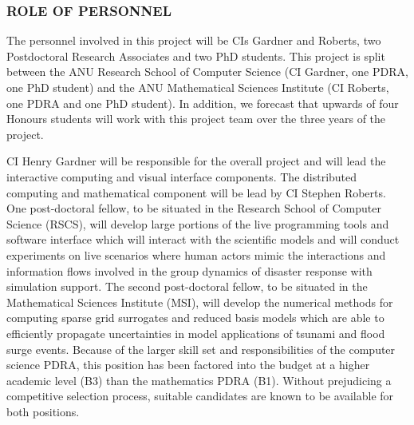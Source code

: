 \documentclass[a4paper,fontsize=13pt]{scrartcl}
\begin{document}
\subsubsection*{ROLE OF PERSONNEL}

%


The personnel involved in this project will be  CIs Gardner and Roberts, two Postdoctoral Research Associates and two PhD students. 
This project is split between the ANU Research School of Computer Science (CI Gardner, one PDRA, one PhD student) and the ANU Mathematical Sciences Institute (CI Roberts, one PDRA and one PhD student). In addition, we forecast that upwards of four Honours students will work with this project team over the three years of the project.

CI Henry Gardner will be responsible for the overall project and will lead the
interactive computing and visual interface components. The distributed computing
and mathematical component will be lead by CI Stephen Roberts. One post-doctoral
fellow, to be situated in the Research School of Computer Science
(RSCS), will develop large portions of the live programming tools and
software interface which will interact with the scientific models and will conduct experiments on live scenarios where human actors mimic the interactions and information flows involved in the group dynamics of disaster response with simulation support. The
second post-doctoral fellow, to be situated in the Mathematical
Sciences Institute (MSI), will develop the numerical methods for
computing sparse grid surrogates and reduced basis models which are
able to efficiently propagate uncertainties in model applications of tsunami and flood surge events. Because of the larger skill set and responsibilities of the computer science PDRA, this position has been factored into the budget at a higher academic level (B3) than the mathematics PDRA (B1). Without prejudicing a competitive selection process, suitable candidates are known to be available for both positions. 
\end{document}
